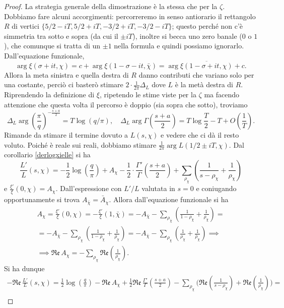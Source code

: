 \begin{proof}
  La strategia generale della dimostrazione è la stessa che per la $\zeta$. Dobbiamo fare alcuni accorgimenti: percorreremo in senso antiorario il rettangolo $R$ di vertici $\{5/2-iT,5/2+iT, -3/2+iT, -3/2-iT\}$; questo perché non c'è simmetria tra sotto e sopra (da cui il $\pm iT$), inoltre si becca uno zero banale ($0$ o $1$), che comunque si tratta di un $\pm 1$ nella formula e quindi possiamo ignorarlo. Dall'equazione funzionale,
  $$\arg\xi(\sigma+it,\chi)=c+\arg\xi(1-\sigma-it,\bar{\chi})=\arg\overline{\xi(1-\sigma+it,\chi)}+c.$$
  Allora la meta sinistra e quella destra di $R$ danno contributi che variano solo per una costante, perciò ci basterò stimare $2\cdot\frac{1}{2\pi}\Delta_L$ dove $L$ è la metà destra di $R$. Riprendendo la definizione di $\xi$, ripetendo le stime viste per la $\zeta$ ma facendo attenzione che questa volta il percorso è doppio (sia sopra che sotto), troviamo
  $$\Delta_L \arg\left(\frac{\pi}{q}\right)^{-\frac{s+a}{2}}=T\log(q/\pi), \quad \Delta_L\arg\Gamma\left(\frac{s+a}{2}\right)=T\log\frac{T}{2}-T+O\left(\frac{1}{T}\right).$$
  Rimande da stimare il termine dovuto a $L(s,\chi)$ e vedere che ci dà il resto voluto. Poiché è reale sui reali, dobbiamo stimare $\frac{1}{2\pi}\arg L(1/2\pm iT,\chi)$. Dal corollario \ref{derlogxielle} si ha
  $$\frac{L'}{L}(s,\chi)=-\frac{1}{2}\log\left(\frac{q}{\pi}\right)+A_\chi-\frac{1}{2}\cdot\frac{\Gamma'}{\Gamma}\left(\frac{s+a}{2}\right)+\sum_{\rho_\chi} \left(\frac{1}{s-\rho_\chi}+\frac{1}{\rho_\chi}\right)$$
  e $\frac{\xi'}{\xi}(0,\chi)=A_\chi$. Dall'espressione con $L'/L$ valutata in $s=0$ e coniugando opportunamente si trova $A_{\bar{\chi}}=\bar{A}_\chi$. Allora dall'equazione funzionale si ha
  \begin{gather*}
    A_\chi=\frac{\xi'}{\xi}(0,\chi)=-\frac{\xi'}{\xi}(1,\bar{\chi})=-A_{\bar{\chi}}-\sum_{\rho_{\bar{\chi}}} \left(\frac{1}{1-\rho_{\bar{\chi}}}+\frac{1}{\rho_{\bar{\chi}}}\right)= \\
    =-A_{\bar{\chi}}-\sum_{\rho_\chi}\left(\frac{1}{1-\bar{\rho}_\chi}+\frac{1}{\bar{\rho}_\chi}\right)=-A_{\bar{\chi}}-\sum_{\rho_\chi}\left(\frac{1}{\rho_\chi}+\frac{1}{\bar{\rho}_\chi}\right) \implies \\
    \implies \mathfrak{Re}\,A_\chi=-\sum_{\rho_\chi} \mathfrak{Re}\left(\frac{1}{\rho_\chi}\right).
  \end{gather*}
  Si ha dunque
  \begin{gather*}
    -\mathfrak{Re}\,\frac{L'}{L}(s,\chi)=\frac{1}{2}\log\left(\frac{q}{\pi}\right)-\mathfrak{Re}\,A_\chi+\frac{1}{2}\mathfrak{Re}\,\frac{\Gamma'}{\Gamma}\left(\frac{s+a}{2}\right)-\sum_{\rho_\chi}\Bigg(\mathfrak{Re}\left(\frac{1}{s-\rho_\chi}\right)+\mathfrak{Re}\left(\frac{1}{\rho_\chi}\right)\Bigg)=\\

\end{gather*}
\end{proof}
